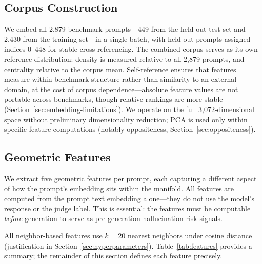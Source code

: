 \subsection{Corpus Construction}
\label{sec:corpus-construction}

We embed all 2,879 benchmark prompts---449 from the held-out test set and 2,430 from the training set---in a single batch, with held-out prompts assigned indices 0--448 for stable cross-referencing. The combined corpus serves as its own reference distribution: density is measured relative to all 2,879 prompts, and centrality relative to the corpus mean. Self-reference ensures that features measure within-benchmark structure rather than similarity to an external domain, at the cost of corpus dependence---absolute feature values are not portable across benchmarks, though relative rankings are more stable (Section~\ref{sec:embedding-limitations}). We operate on the full 3,072-dimensional space without preliminary dimensionality reduction; PCA is used only within specific feature computations (notably oppositeness, Section~\ref{sec:oppositeness}).

\subsection{Geometric Features}
\label{sec:features}

We extract five geometric features per prompt, each capturing a different aspect of how the prompt's embedding sits within the manifold. All features are computed from the prompt text embedding alone---they do not use the model's response or the judge label. This is essential: the features must be computable \emph{before} generation to serve as pre-generation hallucination risk signals.

All neighbor-based features use $k = 20$ nearest neighbors under cosine distance (justification in Section~\ref{sec:hyperparameters}). Table~\ref{tab:features} provides a summary; the remainder of this section defines each feature precisely.

